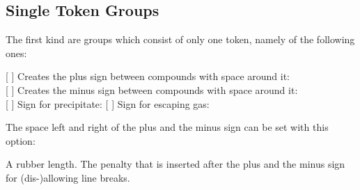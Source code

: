 \documentclass[load-preamble+]{cnltx-doc}
\begin{document}
\subsection{Single Token Groups}
The first kind are groups which consist of only one token, namely of the
following ones:
\begin{commands}
  [\Marg{ + } \ch{ + }]
    Creates the plus sign between compounds with space around it:\\
     
  [\Marg{ - } \ch{ - }]
    Creates the minus sign between compounds with space
    around it:\\
     
  [ ]
    Sign for precipitate:  
  [\Marg{ \textasciicircum\ } \ch{ ^ }]
    Sign for escaping gas\footnotemark: 
\end{commands}

The space left and right of the plus and the minus sign can be set with this
option:
\begin{options}
    A rubber length.
    The penalty that is inserted after the plus and the
    minus sign for (dis-)allowing line breaks.
\end{options}
\begin{example}
  \par
\end{example}
\end{document}

